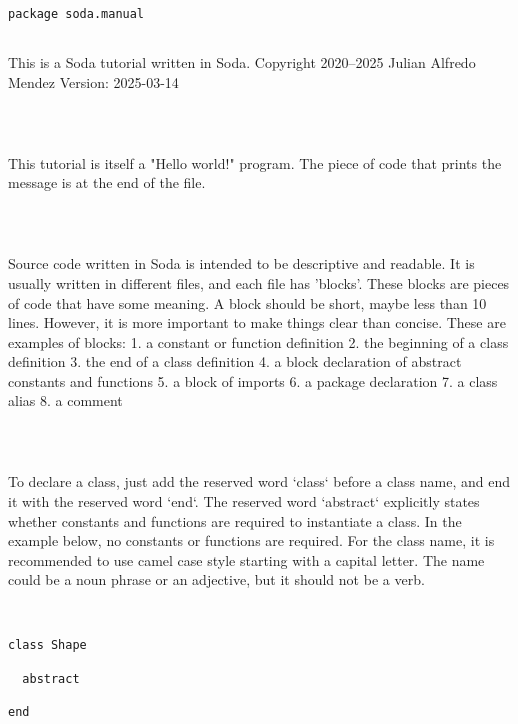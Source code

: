 \documentclass[12pt,a4paper]{article}
\begin{document}
\begin{lstlisting}
package soda.manual


\end{lstlisting}

This is a Soda tutorial written in Soda.
 Copyright 2020--2025 Julian Alfredo Mendez
 Version: 2025-03-14


\begin{lstlisting}



\end{lstlisting}

This tutorial is itself a "Hello world!" program.
 The piece of code that prints the message is at the end of the file.


\begin{lstlisting}



\end{lstlisting}

Source code written in Soda is intended to be descriptive and readable.
 It is usually written in different files, and each file has 'blocks'.
 These blocks are pieces of code that have some meaning.
 A block should be short, maybe less than 10 lines.
 However, it is more important to make things clear than concise.
 These are examples of blocks:
 1. a constant or function definition
 2. the beginning of a class definition
 3. the end of a class definition
 4. a block declaration of abstract constants and functions
 5. a block of imports
 6. a package declaration
 7. a class alias
 8. a comment


\begin{lstlisting}



\end{lstlisting}

To declare a class, just add the reserved word `class` before a class name, and end it with
 the reserved word `end`.
 The reserved word `abstract` explicitly states whether constants and functions are required
 to instantiate a class. In the example below, no constants or functions are required.
 For the class name, it is recommended to use camel case style starting with a capital letter.
 The name could be a noun phrase or an adjective, but it should not be a verb.


\begin{lstlisting}


class Shape

  abstract

end


\end{lstlisting}
\end{document}
